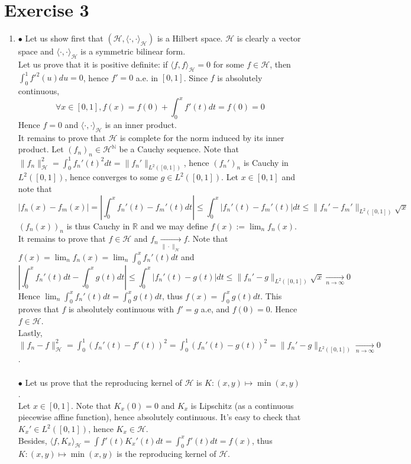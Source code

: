 \documentclass[a4paper,11pt, hidelinks]{article}
\begin{document}
\section*{Exercise 3}

\begin{enumerate}
  \item $\bullet$ Let us show first that $(\mathcal H, \langle \cdot, \cdot \rangle_{\mathcal H})$ is a Hilbert space. $\mathcal H$ is clearly a vector space and $\langle \cdot, \cdot \rangle_{\mathcal H}$ is a symmetric bilinear form.\\ 
  Let us prove that it is positive definite: if $\langle f, f \rangle_{\mathcal H}=0$ for some $f\in \mathcal H$, then $\int_0^1 f'^2(u) du = 0$, hence $f'=0$ a.e. in $[0,1]$. Since $f$ is absolutely continuous, $$\forall x \in [0,1], f(x) = f(0)+\int_0^x f'(t) dt = f(0) = 0$$
  Hence $f=0$ and $\langle \cdot, \cdot \rangle_{\mathcal H}$ is an inner product.\\
  It remains to prove that $\mathcal H$ is complete for the norm induced by its inner product. Let $(f_n)_n \in \mathcal H^{\mathbb N}$ be a Cauchy sequence.
  Note that $\|f_n\|_{\mathcal H}^2 = \int_0^1 f_n'(t)^2 dt = \|f_n'\|_{L^2([0,1])}$, hence $(f_n')_n$ is Cauchy in $L^2([0,1])$, hence converges to some $g\in L^2([0,1])$. Let $x\in [0,1]$ and note that $$|f_n(x)-f_m(x)| = \left|\int_0^x f_n'(t) -f_m'(t) dt\right|\leq \int_0^x |f_n'(t) -f_m'(t)| dt\leq \|f_n' -f_m'\|_{L^2([0,1])} \sqrt x$$
  $(f_n(x))_n$ is thus Cauchy in $\mathbb R$ and we may define $f(x):= \lim_n f_n(x)$. It remains to prove that $f\in \mathcal H$ and $f_n \xrightarrow[\|\cdot\|_{\mathcal H}]{} f$. Note that $f(x) = \lim_n f_n(x) = \lim_n \int_0^x f_n'(t) dt$ and $$\left| \int_0^x f_n'(t) dt - \int_0^x g(t) dt\right|\leq \int_0^x |f_n'(t)-g(t)| dt \leq \|f_n' -g\|_{L^2([0,1])} \sqrt x \xrightarrow[n \to \infty]{} 0$$
  Hence $\lim_n \int_0^x f_n'(t) dt = \int_0^x g(t) dt$, thus $f(x) = \int_0^x g(t) dt$. This proves that $f$ is absolutely continuous with $f'=g$ a.e, and $f(0)=0$. Hence $f\in \mathcal H$.\\
  Lastly, $\|f_n -f\|_{\mathcal H}^2 = \int_0^1 (f_n'(t)-f'(t))^2 = \int_0^1 (f_n'(t)-g(t))^2 = \|f_n'-g\|_{L^2([0,1])} \xrightarrow[n \to \infty]{} 0$. 
  \\ \\
  $\bullet$ Let us prove that the reproducing kernel of $\mathcal H$ is $K:(x,y)\mapsto \min(x,y)$.\\
  Let $x\in [0,1]$. Note that $K_x(0)=0$ and $K_x$ is Lipschitz (as a continuous piecewise affine function), hence absolutely continuous. It's easy to check that $K_x' \in L^2([0,1])$, hence $K_x\in \mathcal H$.\\
  Besides, $\langle f, K_x \rangle_{\mathcal H} = \int f'(t) K_x'(t) dt = \int_0^x f'(t)dt = f(x)$, thus $K:(x,y)\mapsto \min(x,y)$ is the reproducing kernel of $\mathcal H$.


\end{enumerate}
\end{document}
